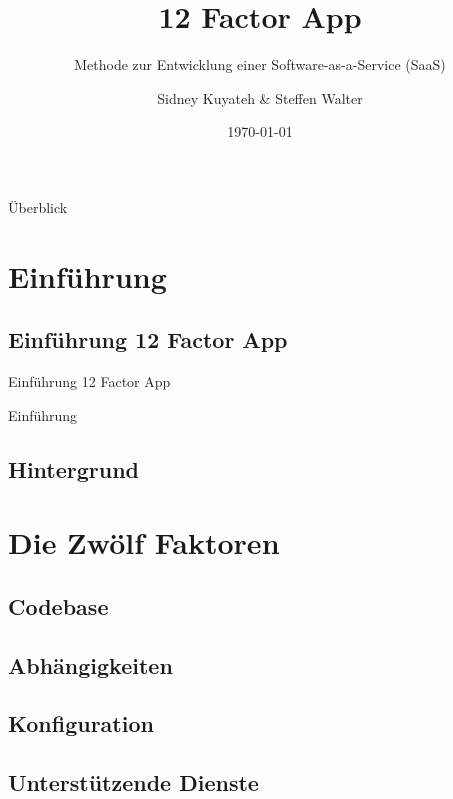 \documentclass{beamer}
\title{12 Factor App}
\subtitle{Methode zur Entwicklung einer Software-as-a-Service (SaaS)}
\author{Sidney Kuyateh \& Steffen Walter}
\institute{Duale Hochschule Baden-Württemberg}
\date{\today}
\begin{document}
	\maketitle
	\begin{frame}{Überblick}
		\scriptsize
		\setlength{\baselineskip}{7pt}
		\tableofcontents[sectionstyle=show]
	\end{frame}
		\section{Einführung}
			\subsection{Einführung 12 Factor App}
				\begin{frame}{Einführung 12 Factor App}
					\begin{block}{Einführung}
						\begin{itemize}
							
						\end{itemize}
					\end{block}
				\end{frame}
			\subsection{Hintergrund}
		\section{Die Zwölf Faktoren}
			\subsection{Codebase}
			\subsection{Abhängigkeiten}
			\subsection{Konfiguration}
			\subsection{Unterstützende Dienste}
\end{document}
